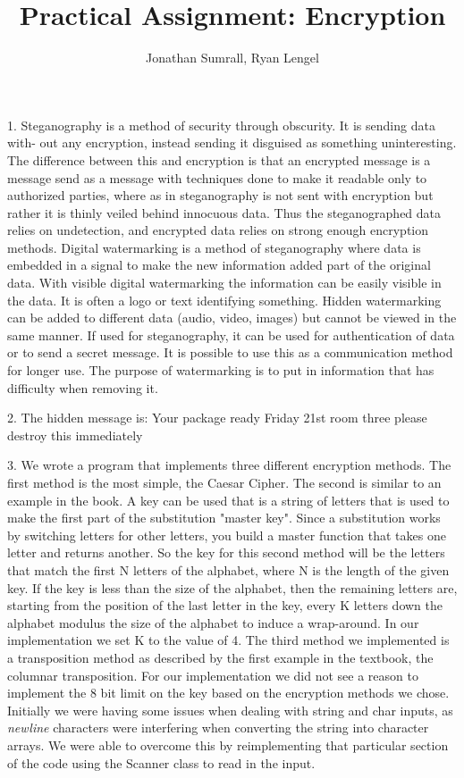 \documentclass[]{apa}
\affiliation{1DV200 Spring 2012}
\author{Jonathan Sumrall, Ryan Lengel}
\title{Practical Assignment: Encryption}
\begin{document}
\doublespace
\maketitle{}

1. Steganography is a method of security through obscurity. It is sending data with-
out any encryption, instead sending it disguised as something uninteresting. The difference
between this and encryption is that an encrypted message is a message send as a message
with techniques done to make it readable only to authorized parties, where as in steganography is not sent with encryption but rather it is thinly veiled behind innocuous data. Thus the steganographed data relies on undetection, and encrypted data relies on strong enough
encryption methods. Digital watermarking is a method of steganography where data is
embedded in a signal to make the new information added part of the original data. With visible digital watermarking the information can be easily visible in the data. It is often a logo or text identifying something. Hidden watermarking can be added to different data (audio, video, images) but cannot be viewed in the same manner. If used for steganography, it can be used for authentication of data or to send a secret message. It is possible to use this as a communication method for longer use. The purpose of watermarking is to put in information that has difficulty when removing it. 


2. The hidden message is:
Your package ready Friday 21st room three please destroy this immediately 

3. We wrote a program that implements three different encryption methods. The first method is the most simple, the Caesar Cipher. The second is similar to an example in the book. A key can be used that is a string of letters that is used to make the first part of the substitution "master key".  Since a substitution works by switching letters for other letters, you build a master function that takes one letter and returns another. So the key for this second method will be the letters that match the first N letters of the alphabet, where N is the length of the given key. If the key is less than the size of the alphabet, then the remaining letters are, starting from the position of the last letter in the key, every K letters down the alphabet modulus the size of the alphabet to induce a wrap-around. In our implementation we set K to the value of 4. The third method we implemented is a transposition method as described by the first example in the textbook, the columnar transposition.  For our implementation we did not see a reason to implement the 8 bit limit on the key based on the encryption methods we chose. Initially we were having some issues when dealing with string and char inputs, as \emph{newline} characters were interfering when converting the string into character arrays. We were able to overcome this by reimplementing that particular section of the code using the Scanner class to read in the input.
\end{document}
